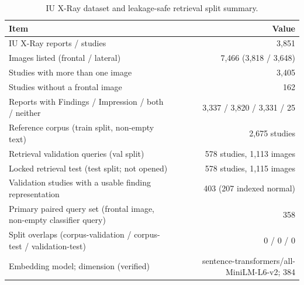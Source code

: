 \begin{table}[t]
\centering
\scriptsize
\begin{tabular}{lr}
\hline
Item & Value \\
\hline
IU X-Ray reports / studies & 3,851 \\
Images listed (frontal / lateral) & 7,466 (3,818 / 3,648) \\
Studies with more than one image & 3,405 \\
Studies without a frontal image & 162 \\
Reports with Findings / Impression / both / neither & 3,337 / 3,820 / 3,331 / 25 \\
Reference corpus (train split, non-empty text) & 2,675 studies \\
Retrieval validation queries (val split) & 578 studies, 1,113 images \\
Locked retrieval test (test split; not opened) & 578 studies, 1,115 images \\
Validation studies with a usable finding representation & 403 (207 indexed normal) \\
Primary paired query set (frontal image, non-empty classifier query) & 358 \\
Split overlaps (corpus-validation / corpus-test / validation-test) & 0 / 0 / 0 \\
Embedding model; dimension (verified) & sentence-transformers/all-MiniLM-L6-v2; 384 \\
\hline
\end{tabular}
\caption{IU X-Ray dataset and leakage-safe retrieval split summary.}
\label{tab:table1_dataset_and_split_summary}
\end{table}
